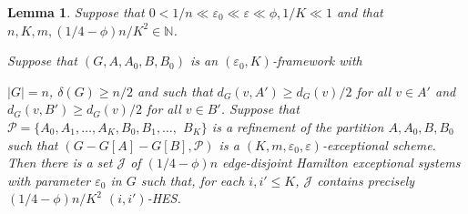 \documentclass{memo-l}
\newtheorem{lemma}[firstthm]{Lemma}
\def\COMMENT#1{}
\def\eps{\varepsilon}
\def\epszero{\eps_0}
\numberwithin{section}{chapter}
\numberwithin{equation}{section}
\numberwithin{firstthm}{section}
\numberwithin{figure}{section}
\begin{document}
\begin{lemma} \label{lma:BESnash2}
Suppose that $0 <  1/n  \ll \epszero \ll  \eps  \ll \phi,  1/K \ll 1$ and that $n, K, m, (1/4 - \phi)n/K^2 \in \mathbb{N}$.%
   \COMMENT{In addition, previously also had that $\phi n \in \mathbb{N}$. But I don't think this is needed and one cannot require
   that both $\phi n, (1/4 - \phi)n/K^2 \in \mathbb{N}$.}
Suppose that $(G,A,A_0,B,B_0)$ is an $(\eps_0,K)$-framework with%
   \COMMENT{Daniela: reworded}
$|G|=n$, $\delta(G) \ge n/2$ and such that 
$d_G(v,A') \ge d_G(v)/2$ for all $v \in A'$ and $d_G(v,B') \ge d_G(v)/2$ for all $v \in B'$.
Suppose that $\mathcal{P}=\{A_0,A_1,\dots,A_K,B_0,B_1,\dots,$ $B_K\}$ is a refinement of the partition $A,A_0,B,B_0$
such that $(G - G[A] - G[B],\mathcal{P})$ is a $(K,m, \epszero, \eps)$-exceptional scheme. 
Then there is a set $\mathcal{J}$ of $(1/4 - \phi) n$ edge-disjoint Hamilton exceptional systems with parameter $\eps_0$ in $G$
such that, for each $i, i' \le K$, $\mathcal{J}$ contains precisely $(1/4 - \phi) n/K^2$ $(i,i')$-HES.
\end{lemma}
\end{document}
